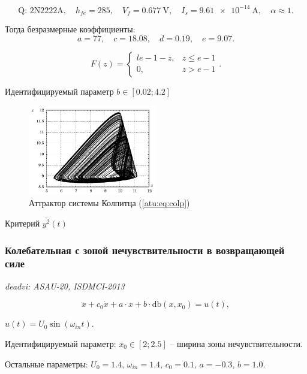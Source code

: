 \documentclass[a4paper,12pt]{article}
\newcommand{\LinkRef}[1]{ \textit{#1} }
\begin{document}
\[
  \text{Q: 2N2222A}, \quad
  h_{fe}=285, \quad
  V_f = \SI{0.677}{\volt}, \quad
  I_s = \SI{9.61e-14}{\ampere}, \quad
  \alpha \approx 1.
\]

Тогда безразмерные коэффициенты:
\[
 a = 77,     \quad
 c = 18.08,  \quad
 d = 0.19,   \quad
 e = 9.07.
\]

\[
F(z) =
\begin{cases}{l}
  e-1-z, & z \le e-1  \\
  0,     & z  >  e-1
\end{cases}.
\]


Идентифицируемый параметр
$b \in [ 0.02; 4.2 ]$

%

\begin{figure}[htb!]
\centerline{\includegraphics[width=0.5\textwidth]{p/cha/colp/colp_phase.pdf} }
\caption{Аттрактор системы Колпитца (\ref{atu:eq:colp})}
\label{atu:f:colp_phase}
\end{figure}


Критерий
$\overline{y^2}(t)$



\FloatBarrier

\subsubsection{Колебательная с зоной нечувствительности в возвращающей силе} %

\LinkRef{
  deadvi: ASAU-20, ISDMCI-2013
}

\begin{equation}
\ddot{x} + c_0 \dot{x} + a \cdot x + b \cdot \mathrm{db}(x,x_0) = u(t),
\label{atu:eq:deadvi}
\end{equation}

$ u(t) = U_0 \sin( \omega_{in} t ) $.

Идентифицируемый параметр:
$ x_0 \in [2;2.5] $ -- ширина зоны нечувствительности.

Остальные параметры:
$U_0 = 1.4$, $\omega_{in} = 1.4$, $c_0=0.1$, $a=-0.3$, $b=1.0$.
\end{document}
